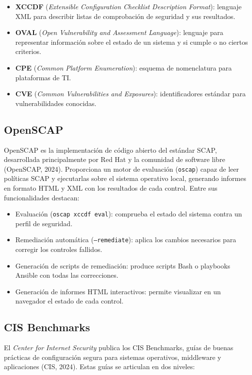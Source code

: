 \documentclass[12pt,letterpaper]{article}
\begin{document}
\begin{itemize}
  \item \textbf{XCCDF} (\textit{Extensible Configuration Checklist Description Format}): lenguaje XML para describir listas de comprobación de seguridad y sus resultados.
  \item \textbf{OVAL} (\textit{Open Vulnerability and Assessment Language}): lenguaje para representar información sobre el estado de un sistema y si cumple o no ciertos criterios.
  \item \textbf{CPE} (\textit{Common Platform Enumeration}): esquema de nomenclatura para plataformas de TI.
  \item \textbf{CVE} (\textit{Common Vulnerabilities and Exposures}): identificadores estándar para vulnerabilidades conocidas.
\end{itemize}

\subsection{OpenSCAP}

OpenSCAP es la implementación de código abierto del estándar SCAP, desarrollada principalmente por Red Hat y la comunidad de software libre (OpenSCAP, 2024). Proporciona un motor de evaluación (\texttt{oscap}) capaz de leer políticas SCAP y ejecutarlas sobre el sistema operativo local, generando informes en formato HTML y XML con los resultados de cada control. Entre sus funcionalidades destacan:

\begin{itemize}
  \item Evaluación (\texttt{oscap xccdf eval}): comprueba el estado del sistema contra un perfil de seguridad.
  \item Remediación automática (\texttt{--remediate}): aplica los cambios necesarios para corregir los controles fallidos.
  \item Generación de scripts de remediación: produce scripts Bash o playbooks Ansible con todas las correcciones.
  \item Generación de informes HTML interactivos: permite visualizar en un navegador el estado de cada control.
\end{itemize}

\subsection{CIS Benchmarks}

El \textit{Center for Internet Security} publica los CIS Benchmarks, guías de buenas prácticas de configuración segura para sistemas operativos, middleware y aplicaciones (CIS, 2024). Estas guías se articulan en dos niveles:
\end{document}

